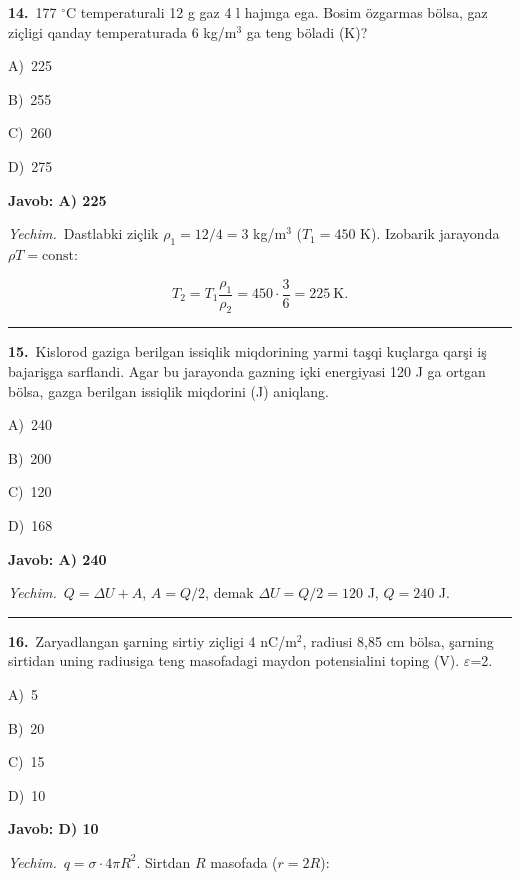 \documentclass[11pt,a4paper]{article}
\newcommand{\opt}[2]{\hspace*{4mm}#1)\ #2\par}
\begin{document}
\noindent\begin{minipage}{\linewidth}
\textbf{14.}\ 177 $^\circ$C temperaturali 12 g gaz 4 l hajmga ega. Bosim özgarmas bölsa, gaz ziçligi qanday temperaturada 6 kg/m$^{3}$ ga teng böladi (K)?\par\smallskip
\opt{A}{225}
\opt{B}{255}
\opt{C}{260}
\opt{D}{275}
\end{minipage}\vspace{2pt}\par
\noindent\colorbox{gray!12}{\parbox{\dimexpr\linewidth-2\fboxsep}{\textbf{Javob: A) 225}}}\par\smallskip
\noindent\textit{Yechim.}\ Dastlabki ziçlik $\rho_1=12/4=3$ kg/m$^3$ ($T_1=450$ K). Izobarik jarayonda $\rho T=\text{const}$:\par
\[T_2=T_1\frac{\rho_1}{\rho_2}=450\cdot\frac36=225\ \text{K}.\]\par\medskip\hrule\medskip
{}\noindent\begin{minipage}{\linewidth}
\textbf{15.}\ Kislorod gaziga berilgan issiqlik miqdorining yarmi taşqi kuçlarga qarşi iş bajarişga sarflandi. Agar bu jarayonda gazning içki energiyasi 120 J ga ortgan bölsa, gazga berilgan issiqlik miqdorini (J) aniqlang.\par\smallskip
\opt{A}{240}
\opt{B}{200}
\opt{C}{120}
\opt{D}{168}
\end{minipage}\vspace{2pt}\par
\noindent\colorbox{gray!12}{\parbox{\dimexpr\linewidth-2\fboxsep}{\textbf{Javob: A) 240}}}\par\smallskip
\noindent\textit{Yechim.}\ $Q=\Delta U+A$, $A=Q/2$, demak $\Delta U=Q/2=120$ J, $Q=240$ J.\par\par\medskip\hrule\medskip
{}\noindent\begin{minipage}{\linewidth}
\textbf{16.}\ Zaryadlangan şarning sirtiy ziçligi 4 nC/m$^{2}$, radiusi 8,85 cm bölsa, şarning sirtidan uning radiusiga teng masofadagi maydon potensialini toping (V). $\varepsilon$=2.\par\smallskip
\opt{A}{5}
\opt{B}{20}
\opt{C}{15}
\opt{D}{10}
\end{minipage}\vspace{2pt}\par
\noindent\colorbox{gray!12}{\parbox{\dimexpr\linewidth-2\fboxsep}{\textbf{Javob: D) 10}}}\par\smallskip
\noindent\textit{Yechim.}\ $q=\sigma\cdot4\pi R^2$. Sirtdan $R$ masofada ($r=2R$):\par
\end{document}
